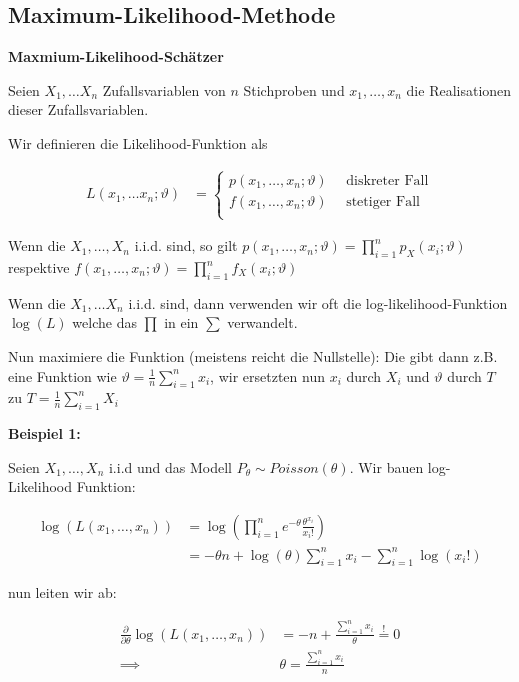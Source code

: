 \documentclass[25pt]{sciposter}
\newenvironment{method}[1]{\begin{mdframed}[backgroundcolor=blue!10,innertopmargin=15pt, innerbottommargin=15pt,nobreak=true]
		\textbf{#1 }
	}
	{ 
	\end{mdframed}
}
\begin{document}
\begin{multicols}{3}
\subsection*{Maximum-Likelihood-Methode}

\begin{method}{Maxmium-Likelihood-Schätzer}
Seien $X_1,\ldots X_n$ Zufallsvariablen von $n$ Stichproben und $x_1,\ldots,x_n$ die Realisationen dieser Zufallsvariablen.	
	
Wir definieren die Likelihood-Funktion als

\begin{align*}
	L(x_1,\ldots x_n;\vartheta) &= \begin{cases}
	p(x_1,\ldots,x_n;\vartheta) \quad \text{ diskreter Fall}\\
	f(x_1,\ldots,x_n;\vartheta) \quad \text{ stetiger Fall}\\
	\end{cases}
\end{align*}

Wenn die $X_1,\ldots,X_n$ i.i.d. sind, so gilt $p(x_1,\ldots,x_n;\vartheta) = \prod_{i=1}^{n}p_X(x_i;\vartheta)$ respektive $f(x_1,\ldots,x_n;\vartheta) = \prod_{i=1}^{n}f_X(x_i;\vartheta)$

Wenn die $X_1,\ldots X_n$ i.i.d. sind, dann verwenden wir oft die log-likelihood-Funktion $\log(L)$ welche das $\prod$ in ein $\sum$ verwandelt.

Nun maximiere die Funktion (meistens reicht die Nullstelle): Die gibt dann z.B. eine Funktion wie $\vartheta = \frac{1}{n}\sum_{i=1}^{n}x_i$, wir ersetzten nun $x_i$ durch $X_i$ und $\vartheta$ durch $T$ zu $T = \frac{1}{n}\sum_{i=1}^{n}X_i$
\end{method}

\textbf{Beispiel 1:}

Seien $X_1,\ldots,X_n$ i.i.d und das Modell $P_{\theta}\sim Poisson(\theta)$. Wir bauen log-Likelihood Funktion:

\begin{align*}
	\log(L(x_1,\ldots,x_n)) &= \log\left(\prod_{i=1}^{n} e^{-\theta} \frac{\theta^{x_i}}{x_i !} \right)\\ &= -\theta n + \log(\theta) \sum_{i=1}^{n} x_i - \sum_{i=1}^{n}\log(x_i !)
\end{align*}

nun leiten wir ab:

\begin{align*}
	\frac{\partial}{\partial \theta}\log(L(x_1,\ldots,x_n)) &= -n + \frac{\sum_{i=1}^{n}x_i}{\theta} \stackrel{!}{=} 0 \\
	\implies & \theta = \frac{\sum_{i=1}^{n} x_i}{n}
\end{align*}


\end{multicols}
\end{document}
